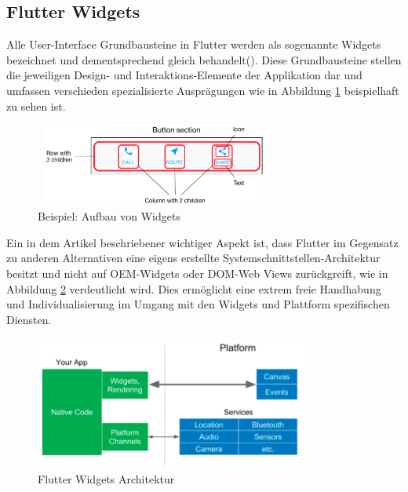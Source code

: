 \documentclass[bibliography=totoc,listof=totoc,BCOR=5mm,DIV=12,oneside]{scrbook}
\begin{document}
\subsection{Flutter Widgets}
\par Alle User-Interface Grundbausteine in Flutter werden als sogenannte Widgets bezeichnet und dementsprechend gleich behandelt(\cite[vgl. Everything’s a Widget]{Flu5}). Diese Grundbausteine stellen die jeweiligen Design- und Interaktions-Elemente der Applikation dar und umfassen verschieden spezialisierte Ausprägungen wie in Abbildung \ref{img:FlutterWidgetButtonSectionExample} beispielhaft zu sehen ist.

\begin{figure}[H]
	\centering
	\includegraphics[width=0.8\textwidth, keepaspectratio]{Bilder/FlutterWidgetButtonSectionExample.png}
	\caption{Beispiel: Aufbau von Widgets  \cite{FlutterBuildingLayouts}}
	\label{img:FlutterWidgetButtonSectionExample}
\end{figure}

\par \medskip Ein in dem Artikel \citep[Widgets]{HackernoonFlutterArcticle} beschriebener wichtiger Aspekt ist, dass Flutter im Gegensatz zu anderen Alternativen eine eigens erstellte Systemschnittstellen-Architektur besitzt und nicht auf OEM-Widgets oder DOM-Web Views zurückgreift, wie in Abbildung \ref{img:hackernoonFlutterArcticleArchitecture} verdeutlicht wird. Dies ermöglicht eine extrem freie Handhabung und Individualisierung im Umgang mit den Widgets und Plattform spezifischen Diensten.

\begin{figure}[H]
	\centering
	\includegraphics[width=0.8\textwidth, keepaspectratio]{Bilder/WidgetsFlutterArchitecture.png}
	\caption{Flutter Widgets Architektur \cite{HackernoonFlutterArcticle}}
	\label{img:hackernoonFlutterArcticleArchitecture}
\end{figure}
\end{document}
